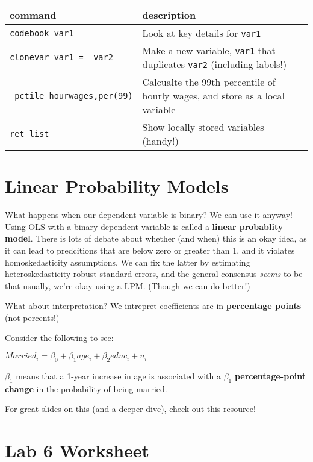 \documentclass[11pt]{article}
\begin{document}
\begin{longtable}[]{@{}
  >{\raggedright\arraybackslash}p{}
  >{\raggedleft\arraybackslash}p{}@{}}
\toprule
command & description \\
\midrule
\endhead
\texttt{codebook\ var1} & Look at key details for \texttt{var1} \\
\texttt{clonevar\ var1\ =\ \ var2} & Make a new variable, \texttt{var1}
that duplicates \texttt{var2} (including labels!) \\
\texttt{\_pctile\ hourwages,per(99)} & Calcualte the 99th percentile of
hourly wages, and store as a local variable \\
\texttt{ret\ list} & Show locally stored variables (handy!) \\
\bottomrule
\end{longtable}

\hypertarget{lpm}{%
\section*{Linear Probability Models}\label{lpm}}

What happens when our dependent variable is binary? We can use it
anyway! Using OLS with a binary dependent variable is called a
\textbf{linear probablity model}. There is lots of debate about whether
(and when) this is an okay idea, as it can lead to predcitions that are
below zero or greater than 1, and it violates homoskedasticity
assumptions. We can fix the latter by estimating
heteroskedasticity-robust standard errors, and the general consensus
\emph{seems} to be that usually, we're okay using a LPM. (Though we can
do better!)

What about interpretation? We intrepret coefficients are in
\textbf{percentage points} (not percents!)

Consider the following to see:

\(Married_i = \beta_0 + \beta_1 age_i + \beta_2 educ_i + u_i\)

\(\beta_1\) means that a 1-year increase in age is associated with a
\(\beta_1\) \textbf{percentage-point change} in the probability of being
married.

For great slides on this (and a deeper dive), check out
\href{https://nickch-k.github.io/EconometricsSlides/Week_08/Week_08_Limited_Dependent_Variables.html}{this
resource}!

\hypertarget{lab-6-worksheet}{%
\section*{Lab 6 Worksheet}\label{lab-6-worksheet}}
\end{document}
